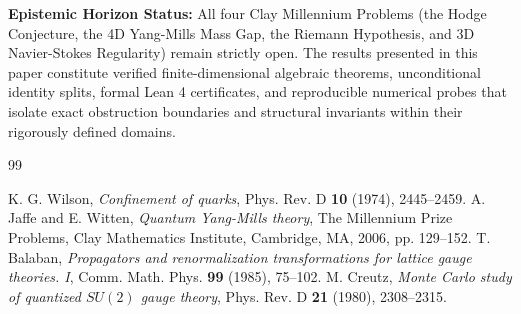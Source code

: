 \documentclass[11pt,a4paper]{article}
\theoremstyle{definition}
\begin{document}
\vspace{0.5em}
\noindent\textbf{Epistemic Horizon Status:} All four Clay Millennium Problems (the Hodge Conjecture, the 4D Yang-Mills Mass Gap, the Riemann Hypothesis, and 3D Navier-Stokes Regularity) remain strictly open. The results presented in this paper constitute verified finite-dimensional algebraic theorems, unconditional identity splits, formal Lean 4 certificates, and reproducible numerical probes that isolate exact obstruction boundaries and structural invariants within their rigorously defined domains.

\begin{thebibliography}{99}

 K. G. Wilson, \emph{Confinement of quarks}, Phys. Rev. D \textbf{10} (1974), 2445--2459.
 A. Jaffe and E. Witten, \emph{Quantum Yang-Mills theory}, The Millennium Prize Problems, Clay Mathematics Institute, Cambridge, MA, 2006, pp. 129--152.
 T. Balaban, \emph{Propagators and renormalization transformations for lattice gauge theories. I}, Comm. Math. Phys. \textbf{99} (1985), 75--102.
 M. Creutz, \emph{Monte Carlo study of quantized $SU(2)$ gauge theory}, Phys. Rev. D \textbf{21} (1980), 2308--2315.

\end{thebibliography}
\end{document}
